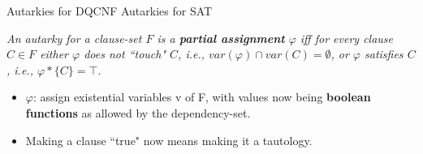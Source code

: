 \documentclass[xcolor=table	]{beamer}
\begin{document}
%
%
%
%

%
% 
% 
%
% 

\begin{frame}{Autarkies for DQCNF}
Autarkies for SAT \newline 

\textit{An autarky for a clause-set $F$ is a \textbf{partial assignment} $\varphi$ iff for every clause $C \in F$ either $\varphi$ does not ``touch" $C$, i.e., $var(\varphi) \cap var(C) = \emptyset$, \newline or $\varphi$ satisfies $C$, i.e., $\varphi \ast \{C\} = \top$.\newline
}
\pause 

\begin{itemize}
	\item $\varphi$: 
	assign existential variables v of F, with values now being \newline \textbf{boolean functions} as allowed by the dependency-set.
	\item Making a clause ``true" now means making it a tautology.
\end{itemize}

%
\end{frame}
\end{document}
